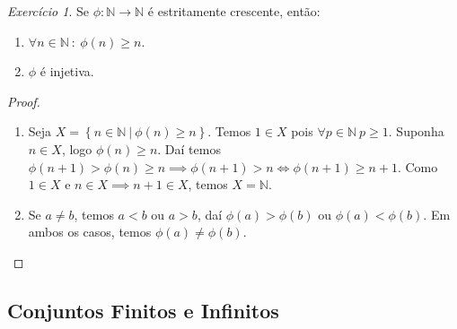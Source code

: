 \documentclass{article}
\theoremstyle{theorem}
\theoremstyle{lemma}
\theoremstyle{definition}
\theoremstyle{remark}
\newtheorem{exercicio}{Exercício}[subsection]
\begin{document}
\begin{exercicio}
	Se $\phi: \mathbb{N} \to \mathbb{N}$ é estritamente crescente, então:
	\begin{enumerate}[label=(\alph*)]
		\item $\forall n \in \mathbb{N} \: : \: \phi(n) \geq n$.
		\item $\phi$ é injetiva.
	\end{enumerate}
\end{exercicio}
\begin{proof}
	~\\
	\begin{enumerate}[label=(\alph*)]
		\item Seja $X = \left\{ n \in \mathbb{N} \: | \: \phi(n) \geq n \right\}$. Temos $1\in X$ pois $\forall p \in \mathbb{N} \: p\geq 1$. Suponha $n\in X$, logo $\phi(n) \geq n$. Daí temos $\phi(n+1) > \phi(n) \geq n \implies \phi(n+1) > n \iff \phi(n+1) \geq n+1$. Como $1\in X$ e $n\in X \implies n+1\in X$, temos $X = \mathbb{N}$.
		\item Se $a \neq b$, temos $a < b$ ou $a > b$, daí $\phi(a) > \phi(b)$ ou $\phi(a) < \phi(b)$. Em ambos os casos, temos  $\phi(a) \neq \phi(b)$.
	\end{enumerate}
\end{proof}
\subsection{Conjuntos Finitos e Infinitos}
\end{document}
